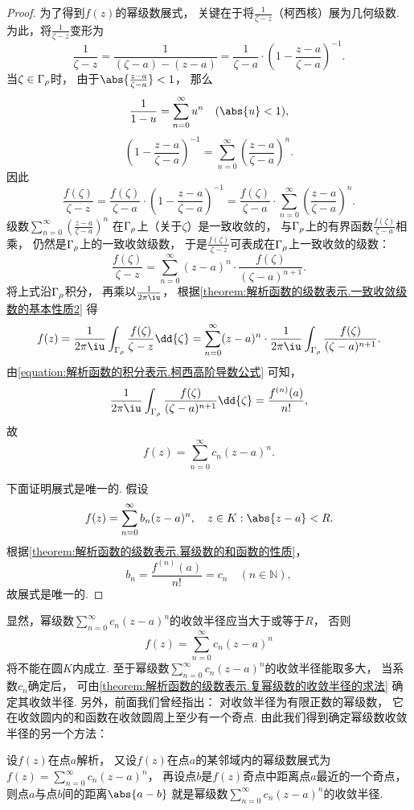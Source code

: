 \begin{theorem}
\begin{proof}
为了得到\(f(z)\)的幂级数展式，
关键在于将\(\frac1{\zeta-z}\)（柯西核）展为几何级数.
为此，将\(\frac1{\zeta-z}\)变形为\[
	\frac1{\zeta-z}
	= \frac1{(\zeta-a)-(z-a)}
	= \frac1{\zeta-a} \cdot \left(1 - \frac{z-a}{\zeta-a}\right)^{-1}.
\]
当\(\zeta \in \Gamma_\rho\)时，
由于\(\abs{\frac{z-a}{\zeta-a}}<1\)，
那么\[
	\frac1{1-u} = \sum_{n=0}^\infty u^n
	\quad(\abs{u}<1),
\]\[
	\left(1 - \frac{z-a}{\zeta-a}\right)^{-1}
	= \sum_{n=0}^\infty \left(\frac{z-a}{\zeta-a}\right)^n.
\]
因此\[
	\frac{f(\zeta)}{\zeta-z}
	= \frac{f(\zeta)}{\zeta-a} \cdot \left(1 - \frac{z-a}{\zeta-a}\right)^{-1}
	= \frac{f(\zeta)}{\zeta-a} \cdot \sum_{n=0}^\infty \left(\frac{z-a}{\zeta-a}\right)^n.
\]
级数\(\sum_{n=0}^\infty \left(\frac{z-a}{\zeta-a}\right)^n\)
在\(\Gamma_\rho\)上（关于\(\zeta\)）是一致收敛的，
与\(\Gamma_\rho\)上的有界函数\(\frac{f(\zeta)}{\zeta-a}\)相乘，
仍然是\(\Gamma_\rho\)上的一致收敛级数，
于是\(\frac{f(\zeta)}{\zeta-z}\)可表成在\(\Gamma_\rho\)上一致收敛的级数：\[
	\frac{f(\zeta)}{\zeta-z}
	= \sum_{n=0}^\infty (z-a)^n \cdot \frac{f(\zeta)}{(\zeta-a)^{n+1}}.
\]
将上式沿\(\Gamma_\rho\)积分，
再乘以\(\frac1{2\pi\iu}\)，
根据\cref{theorem:解析函数的级数表示.一致收敛级数的基本性质2} 得\[
	f(z) = \frac1{2\pi\iu} \int_{\G} \frac{f(\zeta)}{\zeta-z} \dd{\zeta}
	= \sum_{n=0}^\infty (z-a)^n \cdot \frac1{2\pi\iu} \int_{\G} \frac{f(\zeta)}{(\zeta-a)^{n+1}}.
\]
由\cref{equation:解析函数的积分表示.柯西高阶导数公式} 可知，\[
	\frac1{2\pi\iu} \int_{\G} \frac{f(\zeta)}{(\zeta-a)^{n+1}} \dd{\zeta}
	= \frac{f^{(n)}(a)}{n!},
\]
故\[
	f(z) = \sum_{n=0}^\infty c_n (z-a)^n.
\]

下面证明展式是唯一的.
假设\[
	f(z) = \sum_{n=0}^\infty b_n (z-a)^n,
	\quad z \in K: \abs{z-a}<R.
\]
根据\cref{theorem:解析函数的级数表示.幂级数的和函数的性质}，\[
	b_n = \frac{f^{(n)}(a)}{n!} = c_n \quad (n\in\mathbb{N}),
\]
故展式是唯一的.
\end{proof}
\end{theorem}
显然，幂级数\(\sum_{n=0}^\infty c_n (z-a)^n\)的收敛半径应当大于或等于\(R\)，
否则\[
	f(z) = \sum_{n=0}^\infty c_n (z-a)^n
\]将不能在圆\(K\)内成立.
至于幂级数\(\sum_{n=0}^\infty c_n (z-a)^n\)的收敛半径能取多大，
当系数\(c_n\)确定后，
可由\cref{theorem:解析函数的级数表示.复幂级数的收敛半径的求法} 确定其收敛半径.
另外，前面我们曾经指出：
对收敛半径为有限正数的幂级数，
它在收敛圆内的和函数在收敛圆周上至少有一个奇点.
由此我们得到确定幂级数收敛半径的另一个方法：

设\(f(z)\)在点\(a\)解析，
又设\(f(z)\)在点\(a\)的某邻域内的幂级数展式为
\(f(z) = \sum_{n=0}^\infty c_n (z-a)^n\)，
再设点\(b\)是\(f(z)\)奇点中距离点\(a\)最近的一个奇点，
则点\(a\)与点\(b\)间的距离\(\abs{a-b}\)
就是幂级数\(\sum_{n=0}^\infty c_n (z-a)^n\)的收敛半径.

